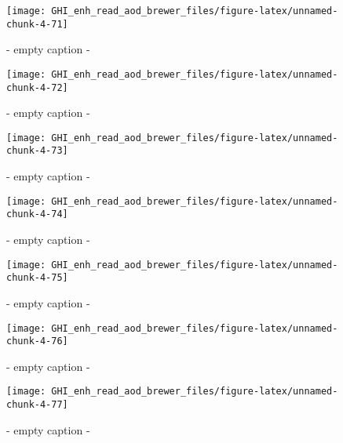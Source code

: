 \documentclass[
  10pt,
  a4paper,oneside]{article}
\begin{document}
\begin{figure}[H]

{\centering \texttt{[image: GHI\_enh\_read\_aod\_brewer\_files/figure-latex/unnamed-chunk-4-71]} 

}

\caption{ - empty caption - }\label{fig:unnamed-chunk-4-71}
\end{figure}
\begin{figure}[H]

{\centering \texttt{[image: GHI\_enh\_read\_aod\_brewer\_files/figure-latex/unnamed-chunk-4-72]} 

}

\caption{ - empty caption - }\label{fig:unnamed-chunk-4-72}
\end{figure}
\begin{figure}[H]

{\centering \texttt{[image: GHI\_enh\_read\_aod\_brewer\_files/figure-latex/unnamed-chunk-4-73]} 

}

\caption{ - empty caption - }\label{fig:unnamed-chunk-4-73}
\end{figure}
\begin{figure}[H]

{\centering \texttt{[image: GHI\_enh\_read\_aod\_brewer\_files/figure-latex/unnamed-chunk-4-74]} 

}

\caption{ - empty caption - }\label{fig:unnamed-chunk-4-74}
\end{figure}
\begin{figure}[H]

{\centering \texttt{[image: GHI\_enh\_read\_aod\_brewer\_files/figure-latex/unnamed-chunk-4-75]} 

}

\caption{ - empty caption - }\label{fig:unnamed-chunk-4-75}
\end{figure}
\begin{figure}[H]

{\centering \texttt{[image: GHI\_enh\_read\_aod\_brewer\_files/figure-latex/unnamed-chunk-4-76]} 

}

\caption{ - empty caption - }\label{fig:unnamed-chunk-4-76}
\end{figure}
\begin{figure}[H]

{\centering \texttt{[image: GHI\_enh\_read\_aod\_brewer\_files/figure-latex/unnamed-chunk-4-77]} 

}

\caption{ - empty caption - }\label{fig:unnamed-chunk-4-77}
\end{figure}
\end{document}
